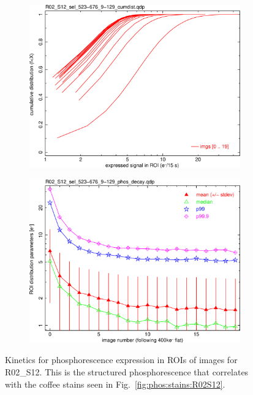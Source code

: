 \begin{figure}[!htbp]
\begin{subfigure}{0.45\textwidth}
  \includegraphics[width=\textwidth]{figures/phosphorescence-survey/phos_kinetics/R02_S12_sel_523-676_9-129_cumdist.png}    
\end{subfigure}
\hfil
\begin{subfigure}{0.45\textwidth}
  \centering
  \includegraphics[width=\textwidth]{figures/phosphorescence-survey/phos_kinetics/R02_S12_sel_523-676_9-129_phos_decay.png}
\end{subfigure}
\newline
\caption{Kinetics for phosphorescence expression in ROIs of images for R02\_S12. This is the structured phosphorescence that correlates with the coffee stains seen in Fig.~\ref{fig:phos:stains:R02S12}.}
\label{fig:phos:kinetics:R02S12}
\end{figure}

